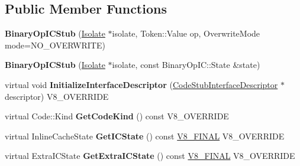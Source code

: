 \subsection*{Public Member Functions}
\begin{DoxyCompactItemize}
\item 
\hypertarget{classv8_1_1internal_1_1_binary_op_i_c_stub_a2634e67cbebfef33d26e69def754bf5e}{}{\bfseries Binary\+Op\+I\+C\+Stub} (\hyperlink{classv8_1_1internal_1_1_isolate}{Isolate} $\ast$isolate, Token\+::\+Value op, Overwrite\+Mode mode=N\+O\+\_\+\+O\+V\+E\+R\+W\+R\+I\+T\+E)\label{classv8_1_1internal_1_1_binary_op_i_c_stub_a2634e67cbebfef33d26e69def754bf5e}

\item 
\hypertarget{classv8_1_1internal_1_1_binary_op_i_c_stub_a8b5f87ff34ff8b30236a2759f33ee438}{}{\bfseries Binary\+Op\+I\+C\+Stub} (\hyperlink{classv8_1_1internal_1_1_isolate}{Isolate} $\ast$isolate, const Binary\+Op\+I\+C\+::\+State \&state)\label{classv8_1_1internal_1_1_binary_op_i_c_stub_a8b5f87ff34ff8b30236a2759f33ee438}

\item 
\hypertarget{classv8_1_1internal_1_1_binary_op_i_c_stub_a7fe465121673070b5a7b4cffbea6eed8}{}virtual void {\bfseries Initialize\+Interface\+Descriptor} (\hyperlink{classv8_1_1internal_1_1_code_stub_interface_descriptor}{Code\+Stub\+Interface\+Descriptor} $\ast$descriptor) V8\+\_\+\+O\+V\+E\+R\+R\+I\+D\+E\label{classv8_1_1internal_1_1_binary_op_i_c_stub_a7fe465121673070b5a7b4cffbea6eed8}

\item 
\hypertarget{classv8_1_1internal_1_1_binary_op_i_c_stub_a8c2767994da2bcbebb8bae6cd01b203c}{}virtual Code\+::\+Kind {\bfseries Get\+Code\+Kind} () const V8\+\_\+\+O\+V\+E\+R\+R\+I\+D\+E\label{classv8_1_1internal_1_1_binary_op_i_c_stub_a8c2767994da2bcbebb8bae6cd01b203c}

\item 
\hypertarget{classv8_1_1internal_1_1_binary_op_i_c_stub_a77747ca2913a5cb164ea0d9d94be3bf6}{}virtual Inline\+Cache\+State {\bfseries Get\+I\+C\+State} () const \hyperlink{classv8_1_1internal_1_1_v8___f_i_n_a_l}{V8\+\_\+\+F\+I\+N\+A\+L} V8\+\_\+\+O\+V\+E\+R\+R\+I\+D\+E\label{classv8_1_1internal_1_1_binary_op_i_c_stub_a77747ca2913a5cb164ea0d9d94be3bf6}

\item 
\hypertarget{classv8_1_1internal_1_1_binary_op_i_c_stub_abe7cc165871de065c92b95091af071b7}{}virtual Extra\+I\+C\+State {\bfseries Get\+Extra\+I\+C\+State} () const \hyperlink{classv8_1_1internal_1_1_v8___f_i_n_a_l}{V8\+\_\+\+F\+I\+N\+A\+L} V8\+\_\+\+O\+V\+E\+R\+R\+I\+D\+E\label{classv8_1_1internal_1_1_binary_op_i_c_stub_abe7cc165871de065c92b95091af071b7}


\end{DoxyCompactItemize}
